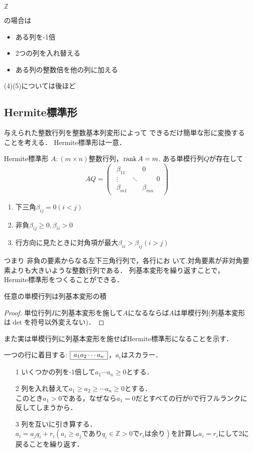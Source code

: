 \hypertarget{basictrans}{$\mathbb{Z}$}の場合は
\begin{itemize}
  \item ある列を-1倍
  \item 2つの列を入れ替える
  \item ある列の整数倍を他の列に加える
\end{itemize}
(4)(5)については後ほど
\subsection{Hermite標準形}
与えられた整数行列を整数基本列変形によって
できるだけ簡単な形に変換することを考える．
Hermite標準形は一意．
\begin{itembox}[l]{Hermite標準形}
$A:(m\times n)$整数行列，$\rank A = m$.
ある単模行列$Q$が存在して
\begin{equation}
  AQ=
  \begin{pmatrix}
    \begin{array}{ccc|}
      {\beta}_{11}&&0\\
      \vdots&\ddots&\\
      {\beta}_{m1}&&{\beta}_{mn}
    \end{array}0
  \end{pmatrix}
\end{equation}
\begin{enumerate}
    \item 下三角${\beta}_{ij}=0(i<j)$
    \item 非負${\beta}_{ij}\geq 0,{\beta}_{ii}>0$
    \item 行方向に見たときに対角項が最大${\beta}_{ii}>{\beta}_{ij}(i>j)$
\end{enumerate}
つまり
非負の要素からなる左下三角行列で，各行にお
いて.対角要素が非対角要素よりも大きいような整数行列である．
列基本変形を繰り返すことで，
Hermite標準形をつくることができる．
\end{itembox}
\begin{thm}
  任意の単模行列は列基本変形の積
\begin{proof}
単位行列$I$に列基本変形を施して$A$になるならば$A$は単模行列(列基本変形は$\det$を符号以外変えない)．
\end{proof}
\end{thm}
また実は単模行列に列基本変形を施せばHermite標準形になることを示す．

一つの行に着目する: $
\begin{array}{|c|}
  \hline
  a_1 a_2 \cdots a_n\\\hline
\end{array}
$，$a_i$はスカラー．
\begin{itemize}
  \item[1]いくつかの列を-1倍して$a_1 \cdots a_n \geq 0$とする．
  \item[2]列を入れ替えて$a_1 \geq a_2 \geq \cdots a_n \geq 0$とする．\\
  このとき$a_1 >0$である，なぜなら$a_1 =0$だとすべての行が0で行フルランクに反してしまうから．
  \item[3]列を互いに引き算する．$a_i = a_j q_i +r_i (a_i \geq a_j でありq_i \in\mathbb{Z}>0でr_i は余り)$を計算し$a_i =r_i$にして2に戻ることを繰り返す．
\end{itemize}

